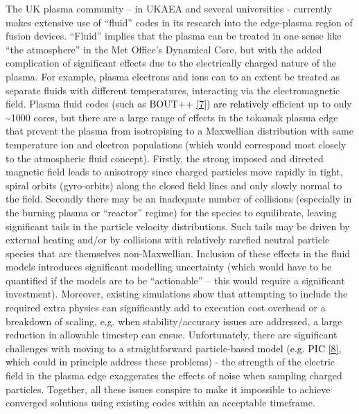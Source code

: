 \documentclass[a4paper]{article}
\newcommand\textstyleInternetlink[1]{\textcolor{blue}{#1}}
\begin{document}
\bigskip

The UK plasma community -- in UKAEA and several universities - currently makes extensive use of ``fluid'' codes in its
research into the edge-plasma region of fusion devices. ``Fluid'' implies that the plasma can be treated in one sense
like ``the atmosphere'' in the Met Office's Dynamical Core, but with the added complication of significant effects due
to the electrically charged nature of the plasma. For example, plasma electrons and ions can to an extent be treated as
separate fluids with different temperatures, interacting via the electromagnetic field. Plasma fluid codes (such as
\textcolor{black}{BOUT++
}\href{https://bout-dev.readthedocs.io/en/latest/user_docs/introduction.html}{\textstyleInternetlink{\textcolor{black}{[7]}}}\textcolor{black}{)
are relatively }efficient up to only \~{}1000 cores, but there are a large range of effects in the tokamak plasma edge
that prevent the plasma from isotropising to a Maxwellian distribution with same temperature ion and electron
populations (which would correspond most closely to the atmospheric fluid concept). Firstly, the strong imposed and
directed magnetic field leads to anisotropy since charged particles move rapidly in tight, spiral orbits (gyro-orbits)
along the closed field lines and only slowly normal to the field. Secondly there may be an inadequate number of
collisions (especially in the burning plasma or ``reactor'' regime) for the species to equilibrate, leaving significant
tails in the particle velocity distributions. Such tails may be driven by external heating and/or by collisions with
relatively rarefied neutral particle species that are themselves non-Maxwellian. Inclusion of these effects in the
fluid models introduces significant modelling uncertainty (which would have to be quantified if the models are to be
``actionable'' -- this would require a significant investment). Moreover, existing simulations show that attempting to
include the required extra physics can significantly add to execution cost overhead or a breakdown of scaling, e.g.
when stability/accuracy issues are addressed, a large reduction in allowable timestep can ensue. Unfortunately, there
are significant challenges with moving to a straightforward particle-based \textcolor{black}{model (e.g. PIC
}\href{https://en.wikipedia.org/wiki/Particle-in-cell}{\textstyleInternetlink{\textcolor{black}{[8]}}}\textcolor{black}{,
which }could in principle address these problems) - the strength of the electric field in the plasma edge exaggerates
the effects of noise when sampling charged particles. Together, all these issues conspire to make it impossible to
achieve converged solutions using existing codes within an acceptable %
timeframe.
\end{document}
